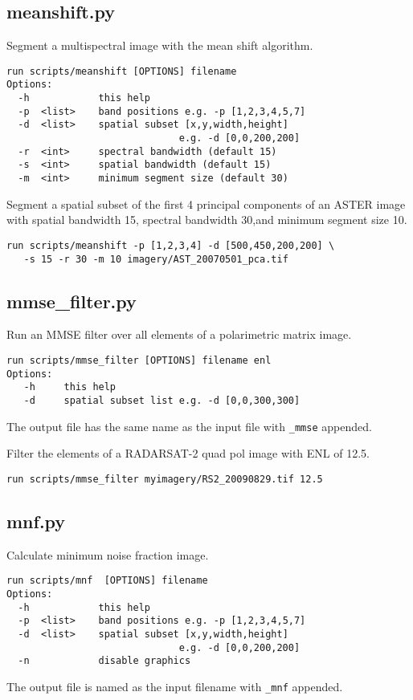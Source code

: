 \documentclass{paper}
\begin{document}
\subsection*{meanshift.py}
Segment a multispectral image with the mean shift algorithm.
\begin{verbatim}
run scripts/meanshift [OPTIONS] filename
Options:
  -h            this help
  -p  <list>    band positions e.g. -p [1,2,3,4,5,7]
  -d  <list>    spatial subset [x,y,width,height]
                              e.g. -d [0,0,200,200]
  -r  <int>     spectral bandwidth (default 15)
  -s  <int>     spatial bandwidth (default 15)
  -m  <int>     minimum segment size (default 30)
\end{verbatim}
 Segment a spatial subset  of the first 4 principal components of an ASTER image with spatial bandwidth 15, spectral bandwidth 30,and minimum segment size 10.
\begin{lstlisting}
run scripts/meanshift -p [1,2,3,4] -d [500,450,200,200] \
   -s 15 -r 30 -m 10 imagery/AST_20070501_pca.tif
\end{lstlisting}


\subsection*{mmse\_filter.py}


Run an MMSE filter over all elements of a polarimetric matrix image.
\begin{verbatim}
run scripts/mmse_filter [OPTIONS] filename enl
Options:
   -h     this help
   -d     spatial subset list e.g. -d [0,0,300,300]
\end{verbatim}
The output file has the same name as the input file with {\tt   \_mmse} appended.


\vskip 0.2cm


 Filter the elements of a RADARSAT-2 quad pol image with ENL of 12.5.
\begin{lstlisting}
run scripts/mmse_filter myimagery/RS2_20090829.tif 12.5
\end{lstlisting}







\subsection*{mnf.py}
Calculate minimum noise fraction image.
\begin{verbatim}
run scripts/mnf  [OPTIONS] filename
Options:
  -h            this help
  -p  <list>    band positions e.g. -p [1,2,3,4,5,7]
  -d  <list>    spatial subset [x,y,width,height]
                              e.g. -d [0,0,200,200]
  -n            disable graphics
\end{verbatim}
The output file is named as the input filename with {\tt \_mnf}  appended.
\end{document}
